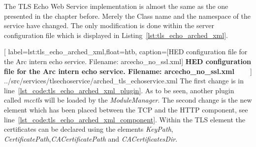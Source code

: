 The TLS Echo Web Service implementation is almost the same as the one presented in the chapter before. Merely the Class name and the namespace of the service have changed. The only modification is done within the server configuration file which is displayed in Listing~\ref{lst:tls_echo_arched_xml}.


	[
	label=lst:tls_echo_arched_xml,float=htb,
	caption={[HED configuration file for the Arc intern echo service. Filename: arcecho\_no\_ssl.xml]
	\textbf{HED configuration file for the Arc intern echo service. Filename: arcecho\_no\_ssl.xml\textcolor{white}{hmf}}}
	]
{../src/services/tlsechoservice/arched_tls_echoservice.xml}
The first change is in line~\ref{lst_code:tls_echo_arched_xml_plugin}. As to be seen, another plugin called \textit{mcctls} will be loaded by the \textit{ModuleManager}. The second change is the new element which has been placed between the TCP and the HTTP component, see line~\ref{lst_code:tls_echo_arched_xml_component}. Within the TLS element the certificates can be declared using the elements \textit{KeyPath}, \textit{CertificatePath},\textit{CACertificatePath} and \textit{CACertificatesDir}.
% 
% 
% 


%
%
%
%
% 


